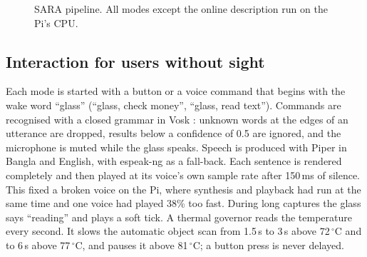 \documentclass[preprint,12pt]{elsarticle}
\begin{document}
\begin{figure}[!htbp]
\centering
{}
\caption{SARA pipeline. All modes except the online description run on the Pi's CPU.}
\label{fig:arch}
\end{figure}

\subsection{Interaction for users without sight}
Each mode is started with a button or a voice command that begins with the wake word ``glass'' (``glass, check money'', ``glass, read text''). Commands are recognised with a closed grammar in Vosk \cite{vosk}: unknown words at the edges of an utterance are dropped, results below a confidence of 0.5 are ignored, and the microphone is muted while the glass speaks. Speech is produced with Piper \cite{piper} in Bangla and English, with espeak-ng \cite{espeakng} as a fall-back. Each sentence is rendered completely and then played at its voice's own sample rate after 150\,ms of silence. This fixed a broken voice on the Pi, where synthesis and playback had run at the same time and one voice had played 38\% too fast. During long captures the glass says ``reading'' and plays a soft tick. A thermal governor reads the temperature every second. It slows the automatic object scan from 1.5\,s to 3\,s above 72\,$^\circ$C and to 6\,s above 77\,$^\circ$C, and pauses it above 81\,$^\circ$C; a button press is never delayed.
\end{document}
